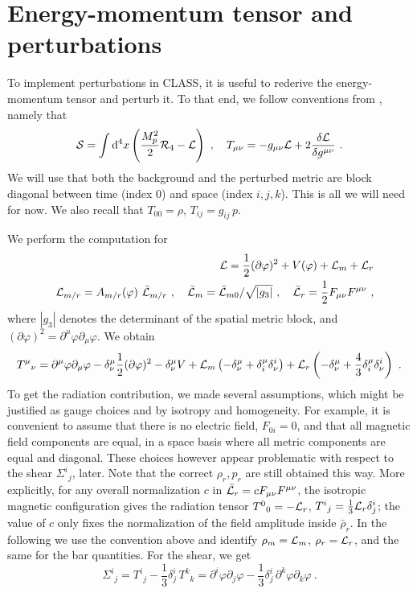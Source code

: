 \documentclass[11pt,a4paper,english,twoside]{article}
\def\beq{\begin{equation}}
\def\eeq{\end{equation}}
\def\bea{\begin{eqnarray}}
\def\eea{\end{eqnarray}}
\def\del {\partial}
\def\d {{\rm d}}
\begin{document}
\section{Energy-momentum tensor and perturbations}

To implement perturbations in CLASS, it is useful to rederive the energy-momentum tensor and perturb it. To that end, we follow conventions from \cite[App. B]{Andriot:2026lac}, namely that
\beq
{\cal S} = \int \d^4 x \left(\frac{M_p^2}{2} {\cal R}_4 - {\cal L} \right) \ ,\quad T_{\mu\nu} = -g_{\mu\nu} {\cal L} + 2 \frac{\delta {\cal L}}{\delta g^{\mu\nu}} \ .
\eeq
We will use that both the background and the perturbed metric are block diagonal between time (index $0$) and space (index $i,j,k$). This is all we will need for now. We also recall that $T_{00} = \rho$, $T_{ij} =g_{ij}\, p$.

We perform the computation for
\bea
&& {\cal L} = \frac{1}{2} (\del \varphi)^2 + V(\varphi) + {\cal L}_m + {\cal L}_r \\
&& {\cal L}_{m/r}  = A_{m/r}(\varphi)\ \bar{{\cal L}}_{m/r} \ ,\quad \bar{{\cal L}}_{m} = \bar{{\cal L}}_{m0}/ \sqrt{|g_3|} \ ,\quad \bar{{\cal L}}_{r} = \frac12 F_{\mu\nu} F^{\mu\nu} \ ,
\eea
where $|g_3|$ denotes the determinant of the spatial metric block, and $(\del \varphi)^2 = \del^{\mu} \varphi \del_{\mu} \varphi$. We obtain
\beq
T^{\mu}{}_{\nu} = \del^{\mu} \varphi \del_{\mu} \varphi - \delta^{\mu}_{\nu} \frac12 (\del \varphi)^2 - \delta^{\mu}_{\nu} V + {\cal L}_m \left( - \delta^{\mu}_{\nu} + \delta^{\mu}_{i} \delta^{i}_{\nu} \right)  + {\cal L}_r  \left( - \delta^{\mu}_{\nu} + \frac43 \delta^{\mu}_{i} \delta^{i}_{\nu} \right) \ . 
\eeq
To get the radiation contribution, we made several assumptions, which might be justified as gauge choices and by isotropy and homogeneity. For example, it is convenient to assume that there is no electric field, $F_{0i}=0$, and that all magnetic field components are equal, in a space basis where all metric components are equal and diagonal. These choices however appear problematic with respect to the shear $\Sigma^i{}_j$, later. Note that the correct $\rho_r, p_r$ are still obtained this way. More explicitly, for any overall normalization $c$ in $\bar{{\cal L}}_r=c F_{\mu\nu}F^{\mu\nu}$, the isotropic magnetic configuration gives the radiation tensor $T^0{}_0=-{\cal L}_r$, $T^i{}_j=\frac13{\cal L}_r\delta^i_j$; the value of $c$ only fixes the normalization of the field amplitude inside $\bar\rho_r$. In the following we use the convention above and identify $\rho_m= {\cal L}_m$, $\rho_r= {\cal L}_r$, and the same for the bar quantities. For the shear, we get
\beq
\Sigma^i{}_j = T^i{}_j - \frac13 \delta^i_j\, T^k{}_k = \del^i \varphi \del_j \varphi - \frac13 \delta^i_j \,  \del^k \varphi \del_k \varphi  \ .
\eeq
\end{document}
